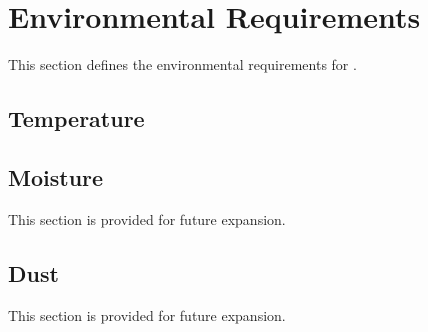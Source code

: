 \KNEADSECTIONNEWPAGE
\section{Environmental Requirements}
\label{lab:sec_Environmental}


This section defines the environmental requirements for \ThisSys.

\KNEADSUBSECTIONNEWPAGE
\subsection{Temperature}
\label{lab:ssec_Environmental_Temperature}




\subsection{Moisture}
\label{lab:ssec_Environmental_Moisture}

This section is provided for future expansion.

%

\subsection{Dust}
\label{lab:ssec_Environmental_Dust}

This section is provided for future expansion.

%


